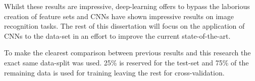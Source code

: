 Whilst these results are impressive, deep-learning offers to bypass the laborious creation of feature sets and CNNs have shown impressive results on image recognition tasks.
The rest of this dissertation will focus on the application of CNNs to the data-set in an effort to improve the current state-of-the-art.

To make the clearest comparison between previous results\citep{du2014machine} and this research the exact same data-split was used.
25\% is reserved for the test-set and 75\% of the remaining data is used for training leaving the rest for cross-validation.